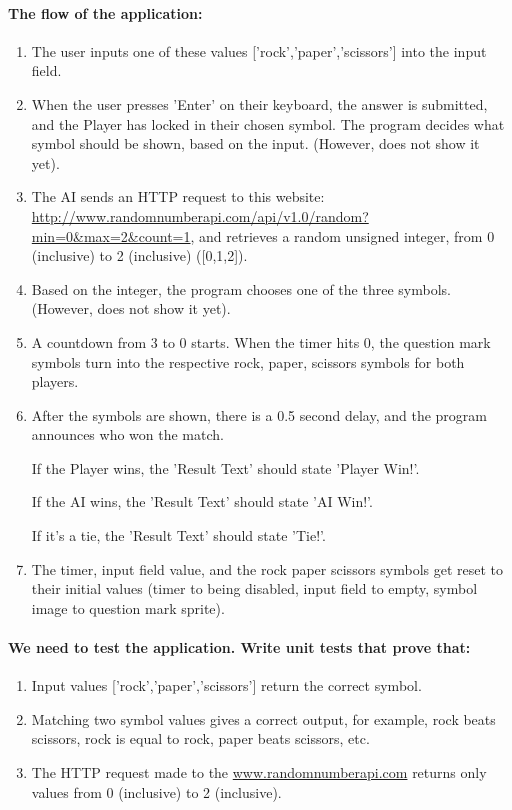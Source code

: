 \documentclass[12pt]{article}
\begin{document}
\clearpage
\paragraph*{The flow of the application:}
\begin{enumerate}
    \item The user inputs one of these values ['rock','paper','scissors'] into the input field.
    \item When the user presses 'Enter' on their keyboard, the answer is submitted, and the Player has locked in their chosen symbol. The program decides what symbol should be shown, based on the input. (However, does not show it yet).
    \item The AI sends an HTTP request to this website:
          \url{http://www.randomnumberapi.com/api/v1.0/random?min=0&max=2&count=1},
          and retrieves a random unsigned integer, from 0 (inclusive) to 2 (inclusive) ([0,1,2]).
    \item Based on the integer, the program chooses one of the three symbols. (However, does not show it yet).
    \item A countdown from 3 to 0 starts.
          When the timer hits 0, the question mark symbols turn into the respective rock, paper, scissors symbols for both players.
    \item After the symbols are shown, there is a 0.5 second delay, and the program announces who won the match. \par
          If the Player wins, the 'Result Text' should state 'Player Win!'. \par
          If the AI wins, the 'Result Text' should state 'AI Win!'. \par
          If it's a tie, the 'Result Text' should state 'Tie!'. \par
    \item The timer, input field value, and the rock paper scissors symbols get reset to their initial values (timer to being disabled, input field to empty, symbol image to question mark sprite).
\end{enumerate}

\paragraph*{We need to test the application. Write unit tests that prove that:}
\begin{enumerate}
    \item Input values ['rock','paper','scissors'] return the correct symbol.
    \item Matching two symbol values gives a correct output, for example, rock beats scissors, rock is equal to rock, paper beats scissors, etc.
    \item The HTTP request made to the \url{www.randomnumberapi.com} returns only values from 0 (inclusive) to 2 (inclusive).
\end{enumerate}
\end{document}

